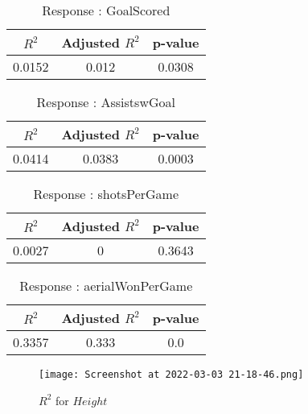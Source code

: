 \documentclass[12pt]{article}
\begin{document}
\begin{minipage}{0.5\textwidth}
	\begin{table}[H]
	\centering
	\caption{Response : GoalScored}\label{table:1a}
	{\begin{tabular}{|c|c|c|}
			\hline
			$ R^2 $ & Adjusted $ R^2 $ & p-value \\
			\hline
			0.0152 & 0.012 & 0.0308 \\
			\hline
		\end{tabular}
	}
\end{table}
\begin{table}[H]
	\centering
	\caption{Response : AssistswGoal}\label{table:1a}
	{\begin{tabular}{|c|c|c|}
			\hline
			$ R^2 $ & Adjusted $ R^2 $ & p-value \\
			\hline
			0.0414 & 0.0383 & 0.0003 \\
			\hline
		\end{tabular}
	}
\end{table}
\end{minipage}
\hfill
\begin{minipage}{0.5\textwidth}
	\begin{table}[H]
	\centering
	\caption{Response : shotsPerGame }\label{table:1a}
	{\begin{tabular}{|c|c|c|}
			\hline
			$ R^2 $ & Adjusted $ R^2 $ & p-value \\
			\hline
			0.0027 & 0 & 0.3643 \\
			\hline
		\end{tabular}
	}
\end{table}
\begin{table}[H]
	\centering
	\caption{Response : aerialWonPerGame}\label{table:1a}
	{\begin{tabular}{|c|c|c|}
			\hline
			$ R^2 $ & Adjusted $ R^2 $ & p-value \\
			\hline
			0.3357 & 0.333 & 0.0 \\
			\hline
		\end{tabular}
	}
\end{table}
\end{minipage}

\begin{figure}[H]
	\centering
	\texttt{[image: Screenshot at 2022-03-03 21-18-46.png]}
	\caption{$ R^2 $ for $ Height $}
	\label{fig:1}
\end{figure}
\end{document}
